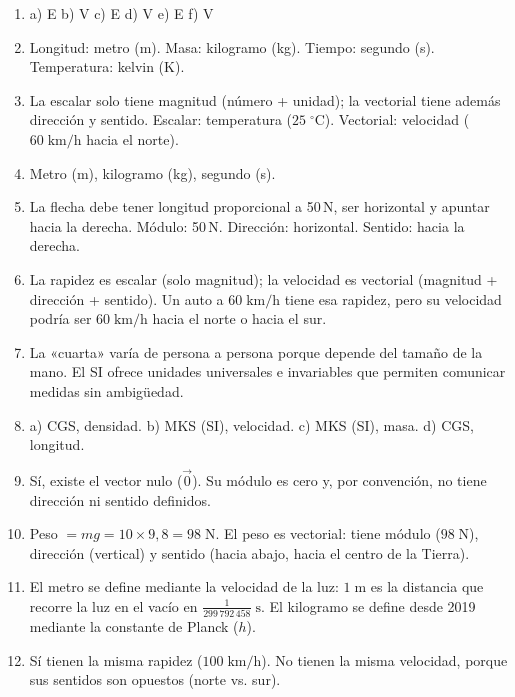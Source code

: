 \documentclass[12pt, letterpaper]{article}
\begin{document}
  \begin{enumerate}[leftmargin=*, label=\textbf{\arabic*.}]
    \item a) E \quad b) V \quad c) E \quad d) V \quad e) E \quad f) V

    \item Longitud: metro (m). Masa: kilogramo (kg). Tiempo: segundo (s). Temperatura: kelvin (K).

    \item La escalar solo tiene magnitud (número + unidad); la vectorial tiene además dirección y sentido. Escalar: temperatura ($25\;^\circ\text{C}$). Vectorial: velocidad ($60\;\text{km/h}$ hacia el norte).

    \item Metro (m), kilogramo (kg), segundo (s).

    \item La flecha debe tener longitud proporcional a 50\,N, ser horizontal y apuntar hacia la derecha. Módulo: 50\,N. Dirección: horizontal. Sentido: hacia la derecha.

    \item La rapidez es escalar (solo magnitud); la velocidad es vectorial (magnitud + dirección + sentido). Un auto a $60\;\text{km/h}$ tiene esa rapidez, pero su velocidad podría ser $60\;\text{km/h}$ hacia el norte o hacia el sur.

    \item La «cuarta» varía de persona a persona porque depende del tamaño de la mano. El SI ofrece unidades universales e invariables que permiten comunicar medidas sin ambigüedad.

    \item a) CGS, densidad. b) MKS (SI), velocidad. c) MKS (SI), masa. d) CGS, longitud.

    \item Sí, existe el vector nulo ($\vec{0}$). Su módulo es cero y, por convención, no tiene dirección ni sentido definidos.

    \item Peso $= mg = 10 \times 9{,}8 = 98\;\text{N}$. El peso es vectorial: tiene módulo ($98\;\text{N}$), dirección (vertical) y sentido (hacia abajo, hacia el centro de la Tierra).

    \item El metro se define mediante la velocidad de la luz: $1\;\text{m}$ es la distancia que recorre la luz en el vacío en $\frac{1}{299\,792\,458}\;\text{s}$. El kilogramo se define desde 2019 mediante la constante de Planck ($h$).

    \item Sí tienen la misma rapidez ($100\;\text{km/h}$). No tienen la misma velocidad, porque sus sentidos son opuestos (norte vs. sur).
  \end{enumerate}
\end{document}
